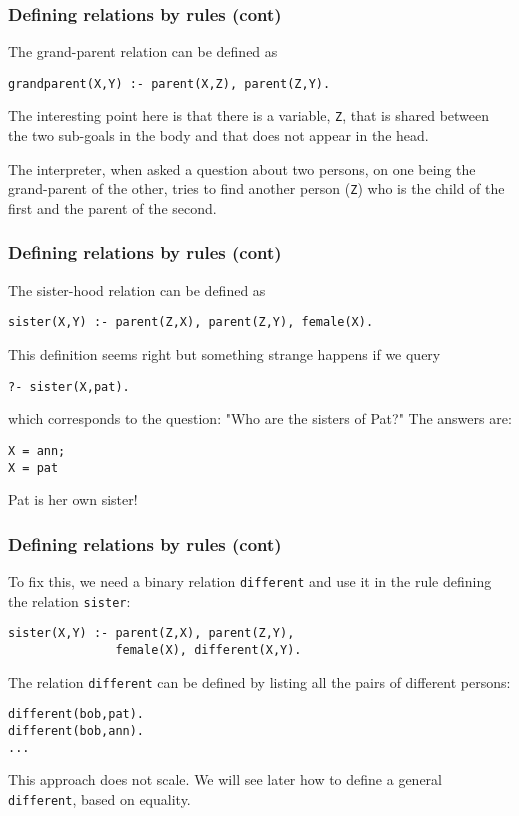 %
\begin{frame}[containsverbatim]
\frametitle{Defining relations by rules (cont)}

The grand-parent relation can be defined as
{\small
\begin{verbatim}
grandparent(X,Y) :- parent(X,Z), parent(Z,Y).
\end{verbatim}
}
The interesting point here is that there is a variable, \texttt{Z},
that is shared between the two sub-goals in the body and that does not
appear in the head.

\bigskip

The interpreter, when asked a question about two persons, on one being
the grand-parent of the other, tries to find another person
(\texttt{Z}) who is the child of the first and the parent of the
second.

\end{frame}

%
\begin{frame}[containsverbatim]
\frametitle{Defining relations by rules (cont)}

The sister-hood relation can be defined as
{\small
\begin{verbatim}
sister(X,Y) :- parent(Z,X), parent(Z,Y), female(X).
\end{verbatim}
}
This definition seems right but something strange happens if we query
{\small
\begin{verbatim}
?- sister(X,pat).
\end{verbatim}
}
which corresponds to the question: "Who are the sisters of Pat?" The
answers are:
{\small
\begin{verbatim}
X = ann;
X = pat
\end{verbatim}
}
Pat is her own sister!

\end{frame}

%
\begin{frame}[containsverbatim]
\frametitle{Defining relations by rules (cont)}

To fix this, we need a binary relation \texttt{different} and use it
in the rule defining the relation \texttt{sister}:
{\small
\begin{verbatim}
sister(X,Y) :- parent(Z,X), parent(Z,Y),
               female(X), different(X,Y).
\end{verbatim}
}
The relation \texttt{different} can be defined by listing all the
pairs of different persons:
{\small 
\begin{verbatim}
different(bob,pat).
different(bob,ann).
...
\end{verbatim}
}
This approach does not scale. We will see later how to define a
general \texttt{different}, based on equality.

\end{frame}
